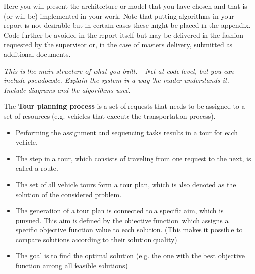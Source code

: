 Here you will present the architecture or model that you have chosen and that is (or will be) implemented in your work. Note that putting algorithms in your report is not desirable but in certain cases these might be placed in the appendix. Code further be avoided in the report itself but may be delivered in the fashion requested by the supervisor or, in the case of masters delivery, submitted as additional documents. 

\textit{This is the main structure of what you built.
- Not at code level, but you can include pseudocode.
Explain the system in a way the reader understands it.
Include diagrams and the algorithms used.}

\par
The \textbf{Tour planning process} is a set of requests that needs to be assigned to a set of resources (e.g. vehicles that execute the transportation process). 
\begin{itemize}
\item Performing the assignment and sequencing tasks results in a tour for each vehicle.  
\item The step in a tour, which consists of traveling from one request to the next, is called a route.
\item The set of all vehicle tours form a tour plan, which is also denoted as the solution of the considered problem. 
\item The generation of a tour plan is connected to a specific aim, which is pursued. This aim is defined by the objective function, which assigns a specific objective function value to each solution. (This makes it possible to compare solutions according to their solution quality)
\item The goal is to find the optimal solution (e.g. the one with the best objective function among all feasible solutions) 
\end{itemize}
\citep{vehiclerouting}

